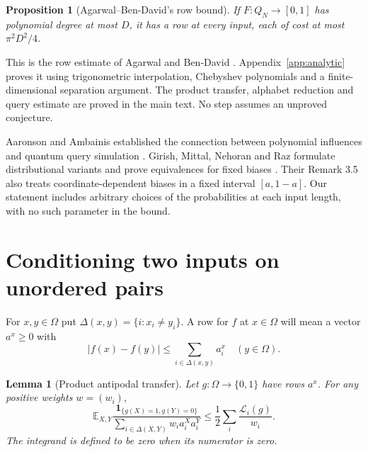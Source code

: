 \documentclass[11pt,reqno]{amsart}
\newtheorem{lemma}[theorem]{Lemma}
\newtheorem{proposition}[theorem]{Proposition}
\theoremstyle{definition}
\theoremstyle{remark}
\newcommand{\E}{\mathbb E}
\newcommand{\one}{\mathbf 1}
\newcommand{\cL}{\mathcal L}
\numberwithin{equation}{section}
\begin{document}
\begin{proposition}[Agarwal--Ben-David's row bound]\label{prop:rows}
If $F\colon Q_N\to[0,1]$ has polynomial degree at most $D$, it has a row
at every input, each of cost at most $\pi^2D^2/4$.
\end{proposition}

This is the row estimate of Agarwal and Ben-David \cite{ABD}.
Appendix~\ref{app:analytic} proves it using trigonometric interpolation,
Chebyshev polynomials and a finite-dimensional separation argument.
The product transfer, alphabet reduction and query estimate are proved
in the main text. No step assumes an unproved conjecture.

Aaronson and Ambainis established the connection between polynomial
influences and quantum query simulation \cite{AA}. Girish, Mittal, Nehoran
and Raz formulate distributional variants and prove equivalences for fixed
biases \cite{GMNR}. Their Remark 3.5 also treats coordinate-dependent biases
in a fixed interval $[a,1-a]$. Our statement includes arbitrary choices of
the probabilities at each input length, with no such parameter in the bound.

\section{Conditioning two inputs on unordered pairs}

For $x,y\in\Omega$ put $\Delta(x,y)=\{i:x_i\ne y_i\}$.
A row for $f$ at $x\in\Omega$ will mean a vector $a^x\ge0$ with
\begin{equation}\label{eq:product-row}
 |f(x)-f(y)|\le\sum_{i\in\Delta(x,y)}a_i^x\quad(y\in\Omega).
\end{equation}

\begin{lemma}[Product antipodal transfer]\label{lem:pair}
Let $g\colon\Omega\to\{0,1\}$ have rows $a^x$. For any positive weights
$w=(w_i)$,
\begin{equation}\label{eq:product-boolean}
 \E_{X,Y}\frac{\one_{\{g(X)=1,g(Y)=0\}}}
 {\sum_{i\in\Delta(X,Y)}w_i a_i^X a_i^Y}
 \le \frac12\sum_i\frac{\cL_i(g)}{w_i}.
\end{equation}
The integrand is defined to be zero when its numerator is zero.
\end{lemma}
\end{document}

